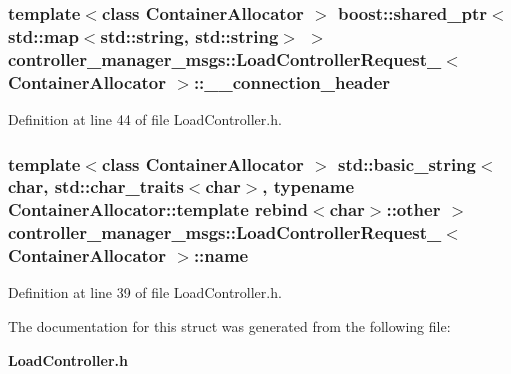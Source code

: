 \subsubsection[{\-\_\-\-\_\-connection\-\_\-header}]{\setlength{\rightskip}{0pt plus 5cm}template$<$class Container\-Allocator $>$ boost\-::shared\-\_\-ptr$<$std\-::map$<$std\-::string, std\-::string$>$ $>$ {\bf controller\-\_\-manager\-\_\-msgs\-::\-Load\-Controller\-Request\-\_\-}$<$ \-Container\-Allocator $>$\-::{\bf \-\_\-\-\_\-connection\-\_\-header}}\label{structcontroller__manager__msgs_1_1LoadControllerRequest___a222367113f8c6f07f719690d6686b38d}


\-Definition at line 44 of file \-Load\-Controller.\-h.

\subsubsection[{name}]{\setlength{\rightskip}{0pt plus 5cm}template$<$class Container\-Allocator $>$ std\-::basic\-\_\-string$<$char, std\-::char\-\_\-traits$<$char$>$, typename \-Container\-Allocator\-::template rebind$<$char$>$\-::other $>$ {\bf controller\-\_\-manager\-\_\-msgs\-::\-Load\-Controller\-Request\-\_\-}$<$ \-Container\-Allocator $>$\-::{\bf name}}\label{structcontroller__manager__msgs_1_1LoadControllerRequest___a22c7d0d4fa05d1206bb3f949c6ba815f}


\-Definition at line 39 of file \-Load\-Controller.\-h.



\-The documentation for this struct was generated from the following file\-:\begin{DoxyCompactItemize}
\item 
{\bf \-Load\-Controller.\-h}\end{DoxyCompactItemize}
